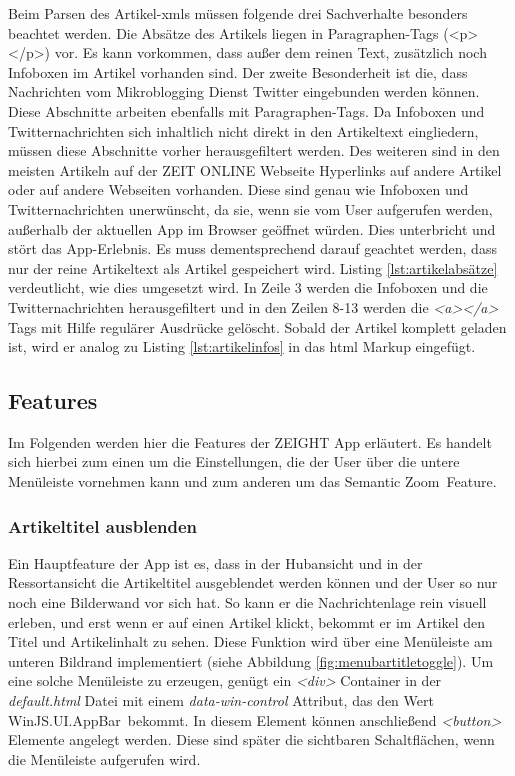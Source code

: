 \documentclass[12pt,a4paper,bibtotoc,abstracton]{scrartcl}
\begin{document}
Beim Parsen des Artikel-\ac{xml}s müssen folgende drei Sachverhalte besonders beachtet werden. Die Absätze des Artikels liegen in Paragraphen-Tags (<p></p>) vor. Es kann vorkommen, dass außer dem reinen Text, zusätzlich noch Infoboxen im Artikel vorhanden sind. Der zweite Besonderheit ist die, dass Nachrichten vom Mikroblogging Dienst Twitter eingebunden werden können. Diese Abschnitte arbeiten ebenfalls mit Paragraphen-Tags. Da Infoboxen und Twitternachrichten sich inhaltlich nicht direkt in den Artikeltext eingliedern, müssen diese Abschnitte vorher herausgefiltert werden. Des weiteren sind in den meisten Artikeln auf der ZEIT ONLINE Webseite Hyperlinks auf andere Artikel oder auf andere Webseiten vorhanden. Diese sind genau wie Infoboxen und Twitternachrichten unerwünscht, da sie, wenn sie vom User aufgerufen werden, außerhalb der aktuellen App im Browser geöffnet würden. Dies unterbricht und stört das App-Erlebnis. Es muss dementsprechend darauf geachtet werden, dass nur der reine Artikeltext als Artikel gespeichert wird. Listing \ref{lst:artikelabsätze} verdeutlicht, wie dies umgesetzt wird. In Zeile 3 werden die Infoboxen und die Twitternachrichten herausgefiltert und in den Zeilen 8-13 werden die \textit{<a></a>} Tags mit Hilfe regulärer Ausdrücke gelöscht. Sobald der Artikel komplett geladen ist, wird er analog zu Listing \ref{lst:artikelinfos} in das \ac{html} Markup eingefügt.

\begin{minipage}{\linewidth}
  
\end{minipage}

\subsection{Features}
\label{subsec:features}
Im Folgenden werden hier die Features der ZEIGHT App erläutert. Es handelt sich hierbei zum einen um die Einstellungen, die der User über die untere Menüleiste vornehmen kann und zum anderen um das \glqq Semantic Zoom\grqq\ Feature.

\subsubsection{Artikeltitel ausblenden}
\label{subsubsec:artikeltitelausblenden}
Ein Hauptfeature der App ist es, dass in der Hubansicht und in der Ressortansicht die Artikeltitel ausgeblendet werden können und der User so nur noch eine Bilderwand vor sich hat. So kann er die Nachrichtenlage rein visuell erleben, und erst wenn er auf einen Artikel klickt, bekommt er im Artikel den Titel und Artikelinhalt zu sehen. Diese Funktion wird über eine Menüleiste am unteren Bildrand implementiert (siehe Abbildung \ref{fig:menubartitletoggle}). Um eine solche Menüleiste zu erzeugen, genügt ein \textit{<div>} Container in der \textit{default.html} Datei mit einem \textit{data-win-control} Attribut, das den Wert \glqq WinJS.UI.AppBar\grqq\ bekommt. In diesem Element können anschließend \textit{<button>} Elemente angelegt werden. Diese sind später die sichtbaren Schaltflächen, wenn die Menüleiste aufgerufen wird.
\end{document}
